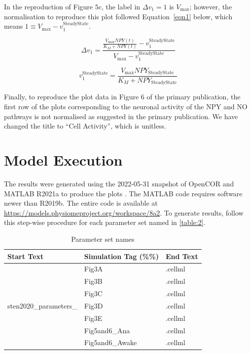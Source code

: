 \documentclass[fleqn,10pt]{physiome}
\begin{document}
In the reproduction of Figure $5$c, the label in $\Delta v_1=1$ is $V_\mathrm{max}$; however, the normalisation to reproduce this plot followed Equation~\ref{eqn1} below, which means $1\equiv V_\mathrm{max}-v_1^\mathrm{SteadyState}$. 

\begin{equation}
    \Delta v_1 = \frac{\frac{V_\mathrm{max}NPY(t)}{K_{M}+NPY(t)}-v_1^{\mathrm{SteadyState}}}{V_\mathrm{max}-v_1^{\mathrm{SteadyState}}}
    \label{eqn1}
\end{equation}

\begin{equation}
    v_1^\mathrm{SteadyState} = \frac{V_\mathrm{max}NPY_\mathrm{SteadyState}}{K_{M}+NPY_\mathrm{SteadyState}}
    \label{eqn2}
\end{equation}

Finally, to reproduce the plot data in Figure $6$ of the primary publication, the first row of the plots corresponding to the neuronal activity of the NPY and NO pathways is not normalised as suggested in the primary publication. We have changed the title to ``Cell Activity'', which is unitless.

\section{Model Execution}

The results were generated using the 2022-05-31 snapshot of OpenCOR \citep{Garny2015} and MATLAB R2021a to produce the plots \citep{MATLABR2021a}. The MATLAB code requires software newer than R2019b. The entire code is available at \url{https://models.physiomeproject.org/workspace/8a2}. To generate results, follow this step-wise procedure for each parameter set named in \autoref{table:2}. 

\begin{table}[htb]
\begin{center}
    \caption{Parameter set names}\label{table:2}
    \begin{tabular}{l l l}
        \toprule
        Start Text & Simulation Tag (\%\%) & End Text \\
        \bottomrule
         & Fig3A & .cellml\\
         & Fig3B & .cellml\\
         & Fig3C & .cellml\\
         sten2020\_parameters\_& Fig3D & .cellml\\
         & Fig3E & .cellml\\
         & Fig5and6\_Ana & .cellml\\
         & Fig5and6\_Awake & .cellml\\
        \bottomrule
    \end{tabular}
    \end{center}
\end{table}
\end{document}
